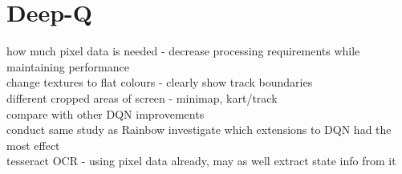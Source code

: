 \section{Deep-Q}
how much pixel data is needed - decrease processing requirements while maintaining performance
\\ change textures to flat colours - clearly show track boundaries
\\different cropped areas of screen - minimap, kart/track
\\ compare with other DQN improvements
\\ conduct same study as Rainbow \cite{hessel2018rainbow} investigate which extensions to DQN had the most effect
\\ tesseract OCR - using pixel data already, may as well extract state info from it
